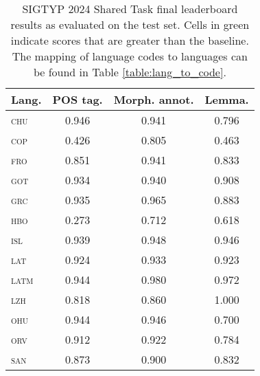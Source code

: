 \documentclass{../acl_latex.tex}
\begin{document}
\begin{table}[t]
    \centering
    \begin{tabular}{lccc}
        \toprule
        Lang.         & POS tag.                  & Morph. annot.             & Lemma.                    \\ \midrule
        \textsc{chu}  & \cellcolor{green!25}0.946 & \cellcolor{green!25}0.941 & 0.796                     \\
        \textsc{cop}  & 0.426                     & 0.805                     & 0.463                     \\
        \textsc{fro}  & 0.851                     & \cellcolor{green!25}0.941 & 0.833                     \\
        \textsc{got}  & \cellcolor{green!25}0.934 & \cellcolor{green!25}0.940 & 0.908                     \\
        \textsc{grc}  & \cellcolor{green!25}0.935 & \cellcolor{green!25}0.965 & 0.883                     \\
        \textsc{hbo}  & 0.273                     & 0.712                     & 0.618                     \\
        \textsc{isl}  & \cellcolor{green!25}0.939 & \cellcolor{green!25}0.948 & \cellcolor{green!25}0.946 \\
        \textsc{lat}  & \cellcolor{green!25}0.924 & \cellcolor{green!25}0.933 & \cellcolor{green!25}0.923 \\
        \textsc{latm} & 0.944                     & \cellcolor{green!25}0.980 & \cellcolor{green!25}0.972 \\
        \textsc{lzh}  & 0.818                     & \cellcolor{green!25}0.860 & \cellcolor{green!25}1.000 \\
        \textsc{ohu}  & \cellcolor{green!25}0.944 & \cellcolor{green!25}0.946 & 0.700                     \\
        \textsc{orv}  & \cellcolor{green!25}0.912 & \cellcolor{green!25}0.922 & 0.784                     \\
        \textsc{san}  & 0.873                     & \cellcolor{green!25}0.900 & 0.832                     \\ \bottomrule
    \end{tabular}
    \caption{
        SIGTYP 2024 Shared Task final leaderboard results as evaluated on the test set.
        Cells in green indicate scores that are greater than the baseline.
        The mapping of language codes to languages can be found in Table \ref{table:lang_to_code}.
    }
    \label{table:main_results}
\end{table}
\end{document}
